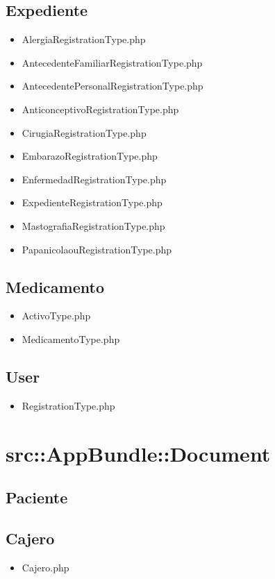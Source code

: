		\subsection{Expediente}
		\begin{itemize}
			\item AlergiaRegistrationType.php
			\item AntecedenteFamiliarRegistrationType.php
			\item AntecedentePersonalRegistrationType.php
			\item AnticonceptivoRegistrationType.php
			\item CirugiaRegistrationType.php
			\item EmbarazoRegistrationType.php
			\item EnfermedadRegistrationType.php
			\item ExpedienteRegistrationType.php
			\item MastografiaRegistrationType.php
			\item PapanicolaouRegistrationType.php
		\end{itemize}
		\subsection{Medicamento}
		\begin{itemize}
			\item ActivoType.php
			\item MedicamentoType.php
		\end{itemize}
		\subsection{User}
		\begin{itemize}
		\item RegistrationType.php
		\end{itemize}
	\newpage	
	\section{src::AppBundle::Document}
	
	\subsection{Paciente}
		\subsection{Cajero}
		\begin{itemize}
			\item Cajero.php
		\end{itemize}				
		

